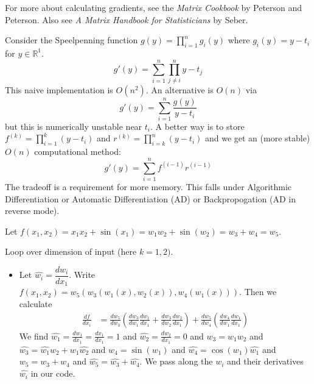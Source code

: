 \documentclass[english, 11pt]{article}
\begin{document}
\begin{enumerate}
\begin{rem}
For more about calculating gradients, see the {\it Matrix Cookbook} by Peterson and Peterson. Also see {\it A Matrix Handbook for Statisticians} by Seber.
\end{rem}


\begin{exmp}
Consider the Speelpenning function $g(y) = \prod_{i=1}^n g_i(y)$ where $g_i(y) = y - t_i$ for $y \in \mathbb{R}^1$.
\[
g'(y) = \sum_{i=1}^n \prod_{j \neq i}^n y-t_j
\]
This naive implementation is $O(n^2)$. An alternative is $O(n)$ via
\[
g'(y) = \sum_{i=1}^n \frac{g(y)}{y-t_i}
\]
but this is numerically unstable near $t_i$. A better way is to store $f^{(k)} = \prod_{i=1}^k (y-t_i)$ and $r^{(k)} = \prod_{i=k}^n (y-t_i)$ and we get an (more stable) $O(n)$ computational method:
\[
g'(y) = \sum_{i=1}^n f^{(i-1)} r^{(i-1)}
\]
The tradeoff is a requirement for more memory. This falls under Algorithmic Differentiation or Automatic Differentiation (AD) or Backpropogation (AD in reverse mode).
\end{exmp}

\begin{exmp}
Let $f(x_1,x_2) = x_1 x_2 + \sin (x_1) = w_1 w_2 + \sin (w_2) = w_3 + w_4 = w_5$. 

Loop over dimension of input (here $k=1,2)$.
\begin{itemize}
\item Let $\widehat{w_i} = \dfrac{dw_i}{dx_1}$. Write $f(x_1,x_2) = w_5( w_3 (w_1(x), w_2(x) ), w_4(w_1(x)))$. Then we calculate
\begin{align*}
\frac{df}{dx_i} &= \frac{dw_5}{dw_3} \left( \frac{dw_3}{dw_1} \frac{dw_1}{dx_1} + \frac{dw_3}{ dw_2} \frac{dw_2}{dx_1} \right) + \frac{dw_5}{dw_4} \left( \frac{dw_4}{dw_1} \frac{dw_1}{dx_1} \right) 
\end{align*}
We find $\widehat{w_1} = \frac{dw_1}{dx_1} = \frac{dx_1}{dx_1} = 1$ and $\widehat{w_2} = \frac{dw_2}{dx_1}=0$ and $w_3 = w_1 w_2$ and $\widehat{w_3} = \widehat{w_1} w_2 + w_1 \widehat{w_2}$ and $w_4 = \sin(w_1)$ and $\widehat{w_4} = \cos(w_1) \widehat{w_1}$ and $w_5 = w_3 + w_4$ and $\widehat{w_5} = \widehat{w_3} + \widehat{w_4}$. We pass along the $w_i$ and their derivatives $\widehat{w_i}$ in our code. 


\end{itemize}
\end{exmp}



\end{enumerate}
\end{document}
